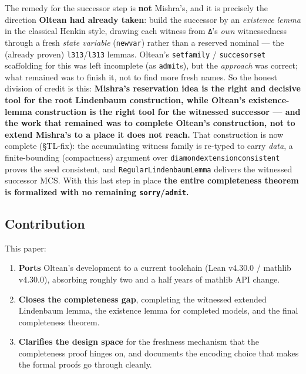 \documentclass[11pt,a4paper]{article}
\renewcommand{\_}{\origtextunderscore\allowbreak}
\begin{document}
The remedy for the successor step is \textbf{not} Mishra's, and it is precisely the direction \textbf{Oltean had already taken}: build the successor by an \emph{existence lemma} in the classical Henkin style, drawing each witness from \texttt{Δ}'s \emph{own} witnessedness through a fresh \emph{state variable} (\texttt{new\_var}) rather than a reserved nominal --- the (already proven) \texttt{l313}/\texttt{l313\textquotesingle{}} lemmas. Oltean's \texttt{set\_family} / \texttt{succesor\_set} scaffolding for this was left incomplete (as \texttt{admit}s), but the \emph{approach} was correct; what remained was to finish it, not to find more fresh names. So the honest division of credit is this: \textbf{Mishra's reservation idea is the right and decisive tool for the root Lindenbaum construction, while Oltean's existence-lemma construction is the right tool for the witnessed successor --- and the work that remained was to complete Oltean's construction, not to extend Mishra's to a place it does not reach.} That construction is now complete (§TL-fix): the accumulating witness family is re-typed to carry \emph{data}, a finite-bounding (compactness) argument over \texttt{diamond\_extension\_consistent} proves the seed consistent, and \texttt{RegularLindenbaumLemma} delivers the witnessed successor MCS. With this last step in place \textbf{the entire completeness theorem is formalized with no remaining \texttt{sorry}/\texttt{admit}.}

\hypertarget{contribution}{%
\subsection{Contribution}\label{contribution}}

This paper:

\begin{enumerate}
\def\labelenumi{\arabic{enumi}.}
\item
  \textbf{Ports} Oltean's development to a current toolchain (Lean v4.30.0 / mathlib v4.30.0), absorbing roughly two and a half years of mathlib API change.
\item
  \textbf{Closes the completeness gap}, completing the witnessed extended Lindenbaum lemma, the existence lemma for completed models, and the final completeness theorem.
\item
  \textbf{Clarifies the design space} for the freshness mechanism that the completeness proof hinges on, and documents the encoding choice that makes the formal proofs go through cleanly.
\end{enumerate}
\end{document}
